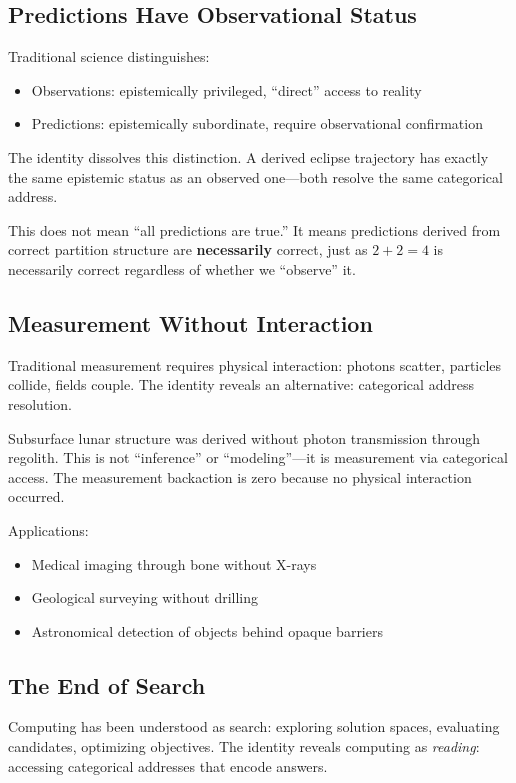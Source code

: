 \documentclass[12pt,a4paper]{article}
\theoremstyle{definition}
\theoremstyle{remark}
\begin{document}
\subsection{Predictions Have Observational Status}

Traditional science distinguishes:
\begin{itemize}
    \item Observations: epistemically privileged, ``direct'' access to reality
    \item Predictions: epistemically subordinate, require observational confirmation
\end{itemize}

The identity dissolves this distinction. A derived eclipse trajectory has exactly the same epistemic status as an observed one---both resolve the same categorical address.

This does not mean ``all predictions are true.'' It means predictions derived from correct partition structure are \textbf{necessarily} correct, just as $2+2=4$ is necessarily correct regardless of whether we ``observe'' it.

\subsection{Measurement Without Interaction}

Traditional measurement requires physical interaction: photons scatter, particles collide, fields couple. The identity reveals an alternative: categorical address resolution.

Subsurface lunar structure was derived without photon transmission through regolith. This is not ``inference'' or ``modeling''---it is measurement via categorical access. The measurement backaction is zero because no physical interaction occurred.

Applications:
\begin{itemize}
    \item Medical imaging through bone without X-rays
    \item Geological surveying without drilling
    \item Astronomical detection of objects behind opaque barriers
\end{itemize}

\subsection{The End of Search}

Computing has been understood as search: exploring solution spaces, evaluating candidates, optimizing objectives. The identity reveals computing as \emph{reading}: accessing categorical addresses that encode answers.
\end{document}
